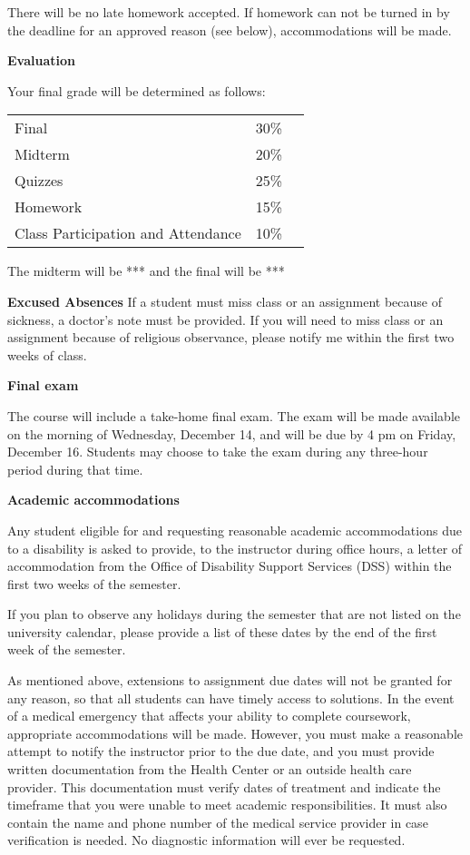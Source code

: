 \documentclass[11pt]{article}
\begin{document}
There will be no late homework accepted. If homework can not be turned in by the deadline for an approved reason (see below), accommodations will be made.

\medskip



{\bf Evaluation}

Your final grade will be determined as follows:

\begin{tabular}{@{}lr@{}l}
Final 	& 30\% \\
Midterm     & 20\% \\
Quizzes  & 25\% \\
Homework & 15\% \\
Class Participation and Attendance & 10\%
\end{tabular}

The midterm will be *** and the final will be ***
\medskip

{\bf Excused Absences}
If a student must miss class or an assignment because of sickness, a doctor's note must be provided. If you will need to miss class or an assignment because of religious observance, please notify me within the first two weeks of class.

{\bf Final exam}

The course will include a take-home final exam.  The exam will be made available on the morning of Wednesday, December 14, and will be due by 4 pm on Friday, December 16.  Students may choose to take the exam during any three-hour period during that time.

\medskip

{\bf Academic accommodations}

Any student eligible for and requesting reasonable academic accommodations due to a disability is asked to provide, to the instructor during office hours, a letter of accommodation from the Office of Disability Support Services (DSS) within the first two weeks of the semester.

If you plan to observe any holidays during the semester that are not listed on the university calendar, please provide a list of these dates by the end of the first week of the semester.

As mentioned above, extensions to assignment due dates will not be granted for any reason, so that all students can have timely access to solutions.  In the event of a medical emergency that affects your ability to complete coursework, appropriate accommodations will be made.  However, you must make a reasonable attempt to notify the instructor prior to the due date, and you must provide written documentation from the Health Center or an outside health care provider.  This documentation must verify dates of treatment and indicate the timeframe that you were unable to meet academic responsibilities. It must also contain the name and phone number of the medical service provider in case verification is needed. No diagnostic information will ever be requested.
\end{document}
